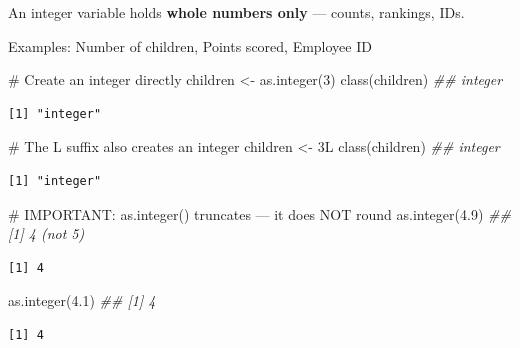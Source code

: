 \documentclass[
  letterpaper,
  DIV=11,
  numbers=noendperiod]{scrreprt}
\newenvironment{Shaded}{\begin{snugshade}}{\end{snugshade}}
\newcommand{\CommentTok}[1]{\textcolor[rgb]{0.37,0.37,0.37}{#1}}
\newcommand{\DecValTok}[1]{\textcolor[rgb]{0.68,0.00,0.00}{#1}}
\newcommand{\DocumentationTok}[1]{\textcolor[rgb]{0.37,0.37,0.37}{\textit{#1}}}
\newcommand{\FloatTok}[1]{\textcolor[rgb]{0.68,0.00,0.00}{#1}}
\newcommand{\FunctionTok}[1]{\textcolor[rgb]{0.28,0.35,0.67}{#1}}
\newcommand{\NormalTok}[1]{\textcolor[rgb]{0.00,0.23,0.31}{#1}}
\newcommand{\OtherTok}[1]{\textcolor[rgb]{0.00,0.23,0.31}{#1}}
\begin{document}
An integer variable holds \textbf{whole numbers only} --- counts,
rankings, IDs.

Examples: Number of children, Points scored, Employee ID

\begin{Shaded}
\begin{Highlighting}[]
\CommentTok{\# Create an integer directly}
\NormalTok{children }\OtherTok{\textless{}{-}} \FunctionTok{as.integer}\NormalTok{(}\DecValTok{3}\NormalTok{)}
\FunctionTok{class}\NormalTok{(children)  }\DocumentationTok{\#\# \textquotesingle{}integer\textquotesingle{}}
\end{Highlighting}
\end{Shaded}

\begin{verbatim}
[1] "integer"
\end{verbatim}

\begin{Shaded}
\begin{Highlighting}[]
\CommentTok{\# The L suffix also creates an integer}
\NormalTok{children }\OtherTok{\textless{}{-}} \DecValTok{3}\NormalTok{L}
\FunctionTok{class}\NormalTok{(children)  }\DocumentationTok{\#\# \textquotesingle{}integer\textquotesingle{}}
\end{Highlighting}
\end{Shaded}

\begin{verbatim}
[1] "integer"
\end{verbatim}

\begin{Shaded}
\begin{Highlighting}[]
\CommentTok{\# IMPORTANT: as.integer() truncates — it does NOT round}
\FunctionTok{as.integer}\NormalTok{(}\FloatTok{4.9}\NormalTok{)  }\DocumentationTok{\#\# [1] 4  (not 5)}
\end{Highlighting}
\end{Shaded}

\begin{verbatim}
[1] 4
\end{verbatim}

\begin{Shaded}
\begin{Highlighting}[]
\FunctionTok{as.integer}\NormalTok{(}\FloatTok{4.1}\NormalTok{)  }\DocumentationTok{\#\# [1] 4}
\end{Highlighting}
\end{Shaded}

\begin{verbatim}
[1] 4
\end{verbatim}
\end{document}
